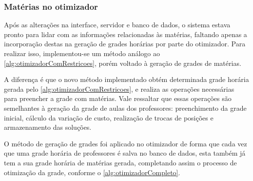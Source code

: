 \subsubsection{Matérias no otimizador}
Após as alterações na interface, servidor e banco de dados, o sistema estava pronto para lidar com as informações relacionadas às matérias, faltando apenas a incorporação destas na geração de grades horárias por parte do otimizador. Para realizar isso, implementou-se um método análogo ao \autoref{alg:otimizadorComRestricoes}, porém voltado à geração de grades de matérias.

A diferença é que o novo método implementado obtém determinada grade horária gerada pelo \autoref{alg:otimizadorComRestricoes}, e realiza as operações necessárias para preencher a grade com matérias. Vale ressaltar que essas operações são semelhantes à geração da grade de aulas dos professores: preenchimento da grade inicial, cálculo da variação de custo, realização de trocas de posições e armazenamento das soluções.

O método de geração de grades foi aplicado no otimizador de forma que cada vez que uma grade horária de professores é salva no banco de dados, esta também já tem a sua grade horária de matérias gerada, completando assim o processo de otimização da grade, conforme o \autoref{alg:otimizadorCompleto}.

